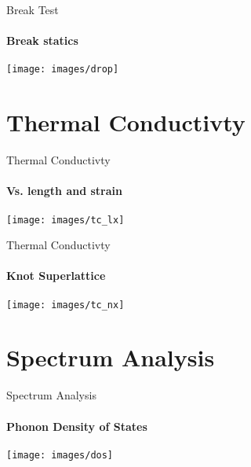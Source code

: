 \documentclass{beamer}
\begin{document}
\begin{frame}{Break Test}
  \framesubtitle{Break statics}%
  \texttt{[image: images/drop]}
\end{frame}

\section{Thermal Conductivty}
\begin{frame}{Thermal Conductivty}
  \framesubtitle{Vs. length and strain}%
  \texttt{[image: images/tc\_lx]}
\end{frame}

\begin{frame}{Thermal Conductivty}
  \framesubtitle{Knot Superlattice}%
  \texttt{[image: images/tc\_nx]}
\end{frame}

\section{Spectrum Analysis}
\begin{frame}{Spectrum Analysis}
  \framesubtitle{Phonon Density of States}%
  \texttt{[image: images/dos]}
\end{frame}
\end{document}
